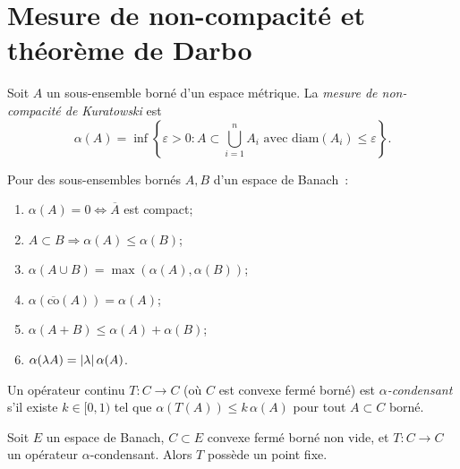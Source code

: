 \section{Mesure de non-compacit\'e et th\'eor\`eme de Darbo}

\begin{definition}
Soit $A$ un sous-ensemble born\'e d'un espace m\'etrique. La \emph{mesure de
non-compacit\'e de Kuratowski} est
\[
    \alpha(A) = \inf\left\{ \varepsilon > 0 : A \subset \bigcup_{i=1}^n A_i
    \text{ avec } \mathrm{diam}(A_i) \leq \varepsilon \right\}.
\]
\end{definition}

\begin{proposition}
Pour des sous-ensembles born\'es $A, B$ d'un espace de Banach~:
\begin{enumerate}
    \item $\alpha(A) = 0 \Leftrightarrow \overline{A}$ est compact;
    \item $A \subset B \Rightarrow \alpha(A) \leq \alpha(B)$;
    \item $\alpha(A \cup B) = \max(\alpha(A), \alpha(B))$;
    \item $\alpha(\overline{\mathrm{co}}(A)) = \alpha(A)$;
    \item $\alpha(A + B) \leq \alpha(A) + \alpha(B)$;
    \item $\alpha(\lambda A) = \left| \lambda \right| \alpha(A)$.
\end{enumerate}
\end{proposition}

\begin{definition}
Un op\'erateur continu $T : C \to C$ (o\`u $C$ est convexe ferm\'e born\'e) est
\emph{$\alpha$-condensant} s'il existe $k \in [0, 1)$ tel que
$\alpha(T(A)) \leq k \, \alpha(A)$ pour tout $A \subset C$ born\'e.
\end{definition}

\begin{theoreme}[Darbo, 1955]\label{thm:darbo}
Soit $E$ un espace de Banach, $C \subset E$ convexe ferm\'e born\'e non vide,
et $T : C \to C$ un op\'erateur $\alpha$-condensant. Alors $T$ poss\`ede un
point fixe.
\end{theoreme}

